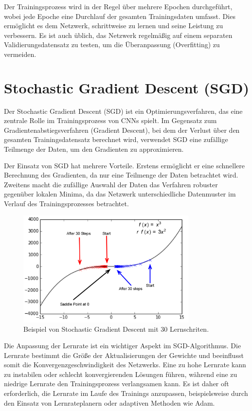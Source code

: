     Der Trainingsprozess wird in der Regel über mehrere Epochen durchgeführt, wobei jede Epoche eine Durchlauf der gesamten Trainingsdaten umfasst. Dies ermöglicht es dem Netzwerk, schrittweise zu lernen und seine Leistung zu verbessern. Es ist auch üblich, das Netzwerk regelmäßig auf einem separaten Validierungsdatensatz zu testen, um die Überanpassung (Overfitting) zu vermeiden.

\section{Stochastic Gradient Descent (SGD)}
    Der Stochastic Gradient Descent (SGD) ist ein Optimierungsverfahren, das eine zentrale Rolle im Trainingsprozess von CNNs spielt. Im Gegensatz zum Gradientenabstiegsverfahren (Gradient Descent), bei dem der Verlust über den gesamten Trainingsdatensatz berechnet wird, verwendet SGD eine zufällige Teilmenge der Daten, um den Gradienten zu approximieren.
    
    Der Einsatz von SGD hat mehrere Vorteile. Erstens ermöglicht er eine schnellere Berechnung des Gradienten, da nur eine Teilmenge der Daten betrachtet wird. Zweitens macht die zufällige Auswahl der Daten das Verfahren robuster gegenüber lokalen Minima, da das Netzwerk unterschiedliche Datenmuster im Verlauf des Trainingsprozesses betrachtet.
    
    \begin{figure}[h]
        \centering
        \includegraphics[width=0.8\textwidth]{img/gradient_descent.png}
        \caption{Beispiel von Stochastic Gradient Descent mit 30 Lernschriten.}
        \label{fig:Stochastic_Gradient_Descent}
    \end{figure}
    
    Die Anpassung der Lernrate ist ein wichtiger Aspekt im SGD-Algorithmus. Die Lernrate bestimmt die Größe der Aktualisierungen der Gewichte und beeinflusst somit die Konvergenzgeschwindigkeit des Netzwerks. Eine zu hohe Lernrate kann zu instabilen oder schlecht konvergierenden Lösungen führen, während eine zu niedrige Lernrate den Trainingsprozess verlangsamen kann. Es ist daher oft erforderlich, die Lernrate im Laufe des Trainings anzupassen, beispielsweise durch den Einsatz von Lernrateplanern oder adaptiven Methoden wie Adam.

